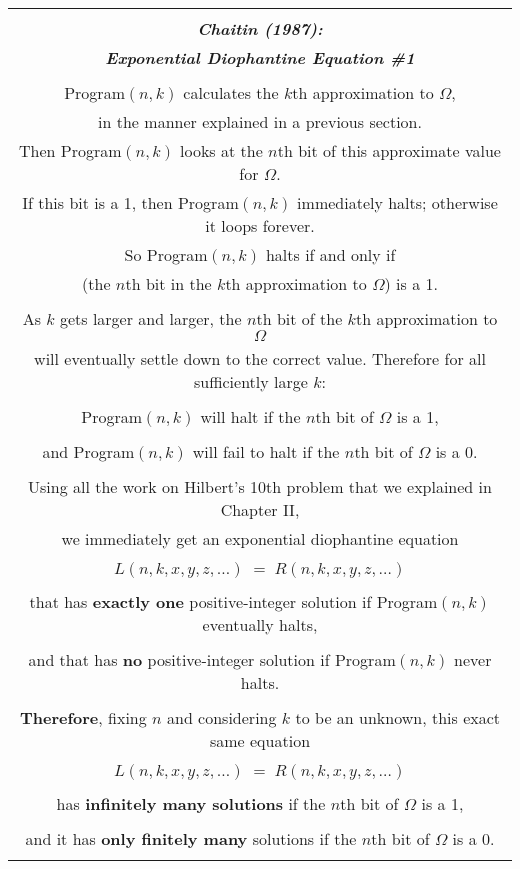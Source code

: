 \documentclass[12pt]{book}
\begin{document}
{\footnotesize
\begin{center}
\begin{tabular}{|c|}
\hline
\\
\textbf{\large \emph{Chaitin (1987):}}
\\
\textbf{\large \emph{Exponential Diophantine Equation \#1}}
\\ \\
Program$(n,k)$ calculates the $k$th approximation to $\Omega$, 
\\
in the manner explained in a previous section.
\\
Then Program$(n,k)$ looks at the $n$th bit of this approximate value for $\Omega$.
\\
If this bit is a 1, then Program$(n,k)$ immediately halts; otherwise it loops forever.
\\
So Program$(n,k)$ halts if and only if 
\\
(the $n$th bit in the $k$th approximation to $\Omega$) is a 1.
\\ \\
As $k$ gets larger and larger, 
the $n$th bit of the $k$th approximation to $\Omega$
\\
will eventually settle down to
the correct value.
Therefore for all sufficiently large $k$:
\\ \\
Program$(n,k)$ will halt if the $n$th bit of $\Omega$ is a 1,
\\ \\
and Program$(n,k)$ will fail to halt if the $n$th bit of $\Omega$ is a 0.
\\ \\
Using all the work on Hilbert's 10th problem that we explained in Chapter II, 
\\
we immediately get an exponential diophantine equation
\\ \\
$L(n, k, x, y, z, \ldots) \; = \; R(n, k, x, y, z, \ldots)$
\\ \\
that has \textbf{exactly one} positive-integer solution
if Program$(n,k)$ eventually halts,  
\\ \\
and that has \textbf{no} positive-integer solution if Program$(n,k)$ never halts.
\\ \\
\textbf{Therefore}, fixing $n$ and considering $k$ to be an unknown, this exact same equation
\\ \\
$L(n, k, x, y, z, \ldots) \; = \; R(n, k, x, y, z, \ldots)$
\\ \\
has \textbf{infinitely many solutions}
if the $n$th bit of $\Omega$ is a 1,  
\\ \\
and it has \textbf{only finitely many} solutions
if the $n$th bit of $\Omega$ is a 0.
\\
\\
\hline
\end{tabular}
\end{center}

}
\end{document}
